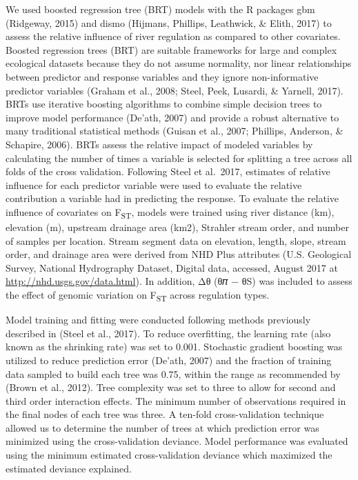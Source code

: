 \documentclass[proquest,12pt,final]{ucthesis-CA2012} %
\begin{document}
\begin{ucmainmatter}
We used boosted regression tree (BRT) models with the R packages gbm
(Ridgeway, 2015) and dismo (Hijmans, Phillips, Leathwick, \& Elith,
2017) to assess the relative influence of river regulation as compared
to other covariates. Boosted regression trees (BRT) are suitable
frameworks for large and complex ecological datasets because they do not
assume normality, nor linear relationships between predictor and
response variables and they ignore non-informative predictor variables
(Graham et al., 2008; Steel, Peek, Lusardi, \& Yarnell, 2017). BRTs use
iterative boosting algorithms to combine simple decision trees to
improve model performance (De'ath, 2007) and provide a robust
alternative to many traditional statistical methods (Guisan et al.,
2007; Phillips, Anderson, \& Schapire, 2006). BRTs assess the relative
impact of modeled variables by calculating the number of times a
variable is selected for splitting a tree across all folds of the cross
validation. Following Steel et al.~2017, estimates of relative influence
for each predictor variable were used to evaluate the relative
contribution a variable had in predicting the response. To evaluate the
relative influence of covariates on F\textsubscript{ST}, models were
trained using river distance (km), elevation (m), upstream drainage area
(km2), Strahler stream order, and number of samples per location. Stream
segment data on elevation, length, slope, stream order, and drainage
area were derived from NHD Plus attributes (U.S. Geological Survey,
National Hydrography Dataset, Digital data, accessed, August 2017 at
\url{http://nhd.usgs.gov/data.html}). In addition, Δθ (θ𝜋 − θS) was
included to assess the effect of genomic variation on
F\textsubscript{ST} across regulation types.

Model training and fitting were conducted following methods previously
described in (Steel et al., 2017). To reduce overfitting, the learning
rate (also known as the shrinking rate) was set to 0.001. Stochastic
gradient boosting was utilized to reduce prediction error (De'ath, 2007)
and the fraction of training data sampled to build each tree was 0.75,
within the range as recommended by (Brown et al., 2012). Tree complexity
was set to three to allow for second and third order interaction
effects. The minimum number of observations required in the final nodes
of each tree was three. A ten-fold cross-validation technique allowed us
to determine the number of trees at which prediction error was minimized
using the cross-validation deviance. Model performance was evaluated
using the minimum estimated cross-validation deviance which maximized
the estimated deviance explained.


\end{ucmainmatter}
\end{document}
